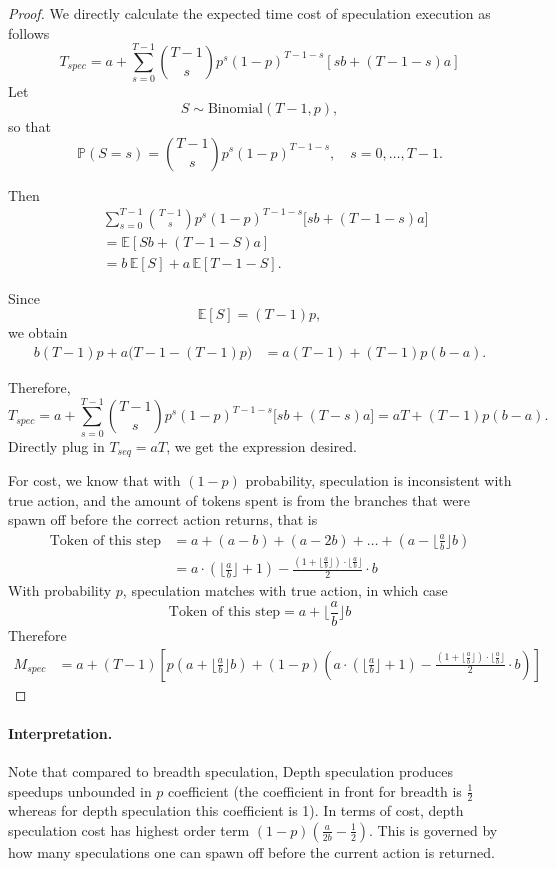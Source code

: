 \begin{proof}
    We directly calculate the expected time cost of speculation execution as follows
    \[T_{spec} = a+ \sum_{s=0}^{T-1}\binom{T-1}{s}p^s(1-p)^{T-1-s}[sb+(T-1-s)a]\]
    Let 
\[
S \sim \mathrm{Binomial}(T-1, p),
\]
so that
\[
\mathbb{P}(S=s) = \binom{T-1}{s} p^s (1-p)^{T-1-s}, 
\quad s = 0, \dots, T-1.
\]

Then
\begin{align*}
&\sum_{s=0}^{T-1} \binom{T-1}{s} p^s (1-p)^{T-1-s}
\bigl[sb + (T-1-s)a\bigr] \\
&= \mathbb{E}\!\left[Sb + (T-1-S)a\right] \\
&= b\,\mathbb{E}[S] + a\,\mathbb{E}[T-1-S].
\end{align*}

Since
\[
\mathbb{E}[S] = (T-1)p,
\]
we obtain
\begin{align*}
b(T-1)p + a\bigl(T -1- (T-1)p\bigr)
&= a(T-1) + (T-1)p(b-a).
\end{align*}

Therefore,
\[T_{spec} = a+ 
\sum_{s=0}^{T-1} \binom{T-1}{s} p^s (1-p)^{T-1-s}
\bigl[sb + (T-s)a\bigr]
= aT + (T-1)p(b-a).
\]
Directly plug in $T_{seq} = aT$, we get the expression desired.

For cost, we know that with $(1-p)$ probability, speculation is inconsistent with true action, and the amount of tokens spent is from the branches that were spawn off before the correct action returns, that is
\begin{align*}
    \text{Token of this step} &= a+(a-b)+(a-2b)+\dots + \left(a-\lfloor\frac{a}{b}\rfloor b\right)\\
    &=a\cdot\left(\lfloor\frac{a}{b}\rfloor+1\right) - \frac{\left(1+\lfloor\frac{a}{b}\rfloor\right)\cdot\lfloor\frac{a}{b}\rfloor}{2}\cdot b
\end{align*}
With probability $p$, speculation matches with true action, in which case
\[\text{Token of this step} = a+ \lfloor\frac{a}{b}\rfloor b\]
Therefore
\begin{align*}
    M_{spec} &= a+ (T-1)\left[p\left(a+ \lfloor\frac{a}{b}\rfloor b\right)+(1-p)\left(a\cdot\left(\lfloor\frac{a}{b}\rfloor+1\right) - \frac{\left(1+\lfloor\frac{a}{b}\rfloor\right)\cdot\lfloor\frac{a}{b}\rfloor}{2}\cdot b\right)\right]
\end{align*}
\end{proof}

\paragraph{Interpretation.}
Note that compared to breadth speculation, Depth speculation produces speedups unbounded in $p$ coefficient (the coefficient in front for breadth is $\frac{1}{2}$ whereas for depth speculation this coefficient is 1). In terms of cost, depth speculation cost has highest order term $(1-p)(\frac{a}{2b}-\frac{1}{2})$. This is governed by how many speculations one can spawn off before the current action is returned. 


